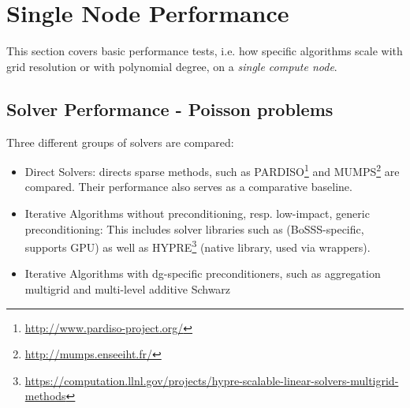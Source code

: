 \documentclass[a4paper,10pt]{report} %
\begin{document}
\chapter{Single Node Performance}
\label{sec:SingleNodePerformance}
This section covers basic performance tests, i.e. how specific algorithms scale 
with grid resolution or with polynomial degree, on a \emph{single compute node}.

\section{Solver Performance - Poisson problems}
\label{sec:SolverPerformancePoisson}
Three different groups of solvers are compared:
\begin{itemize}
\item
Direct Solvers: directs sparse methods, such as PARDISO\footnote{
\url{http://www.pardiso-project.org/}}
and MUMPS\footnote{
\url{http://mumps.enseeiht.fr/}}
are compared.
Their performance also serves as a comparative baseline.

\item
Iterative Algorithms without preconditioning, resp. low-impact, generic preconditioning:
This includes solver libraries such as  (BoSSS-specific, supports GPU)
as well as 
HYPRE\footnote{
\url{https://computation.llnl.gov/projects/hypre-scalable-linear-solvers-multigrid-methods}}
(native library, used via wrappers).

\item
Iterative Algorithms with \ac{dg}-specific preconditioners, such as aggregation multigrid
and multi-level additive Schwarz
\end{itemize}
\end{document}
